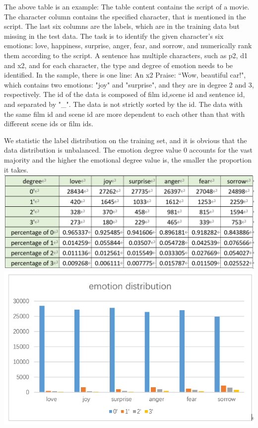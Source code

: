 \documentclass[12pt,twocolumn,letterpaper]{article}
\begin{document}
The above table is an example: The table content contains the script of a movie. The character column contains the specified character, that is mentioned in the script. The last six columns are the labels, which are in the training data but missing in the test data. The task is to identify the given character’s six emotions: love, happiness, surprise, anger, fear, and sorrow, and numerically rank them according to the script. A sentence has multiple characters, such as p2, d1 and x2, and for each character, the type and degree of emotion needs to be identified. In the sample, there is one line: An x2 Praise: “Wow, beautiful car!", which contains two emotions: "joy" and "surprise", and they are in degree 2 and 3, respectively. The id of the data is composed of film id,scene id and sentence id, and separated by "\_". The data is not strictly sorted by the id. The data with the same film id and scene id are more dependent to each other than that with different scene ids or film ids.

We statistic the label distribution on the training set, and it is obvious that the data distribution is unbalanced. The emotion degree value 0 accounts for the vast majority and the higher the emotional degree value is, the smaller the proportion it takes.  \\

\includegraphics[scale=0.19]{data distribution.png}\\

\includegraphics[scale=0.3]{emotion distribution.png}
\end{document}
